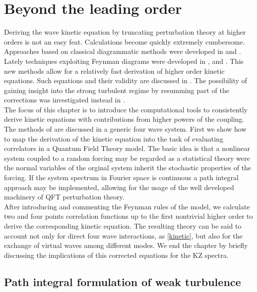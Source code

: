
\newpage
\phantom{}
\thispagestyle{empty}
\section{Beyond the leading order}
Deriving the wave kinetic equation by truncating perturbation theory at higher orders is not an easy feat. Calculations become quickly extremely cumbersome. Approaches 
based on classical diagrammatic methods were developed in \cite{Zakharov1975} and \cite{Gurarie:1994ut}. Lately techniques exploiting Feynman diagrams were developed in
\cite{Rosenhaus2023}, \cite{Rosenhaus:2022uwa} and \cite{Rosenhaus:2023sik}. This new methods allow for a relatively fast derivation of higher order kinetic equations.
Such equations and their validity are discussed in \cite{Rosenhaus:2023pdj}. The possibility of gaining insight into the strong turbulent regime by resumming 
part of the corrections was investigated instead in \cite{Rosenhaus:2025mgj}. \\
The focus of this chapter is to introduce the computational tools to consistently derive kinetic equations with contributions from higher powers of the coupling. 
The methods of \cite{Rosenhaus2023} are discussed in a generic four wave system. First we show how to map the derivation of the kinetic equation into
the task of evaluating correlators in a Quantum Field Theory model. The basic idea is that a nonlinear system coupled to a random forcing may be regarded as 
a statistical theory were the normal variables of the orginal system inherit the stochastic properties of the forcing. If the system spectrum in Fourier space is continuous
a path integral approach may be implemented, allowing for the usage of the well developed machinery of QFT perturbation theory.\\
After introducing and commenting the Feynman rules of the model, we calculate two and four points 
correlation functions up to the first nontrivial higher order to derive the corresponding kinetic equation. The resulting theory can be said to account 
not only for direct four wave interactions, as \eqref{kinetic}, but also for the exchange of virtual waves among different modes. We end the chapter by briefly discussing the implications
of this corrected equations for the KZ spectra. \\  
\subsection{Path integral formulation of weak turbulence}

